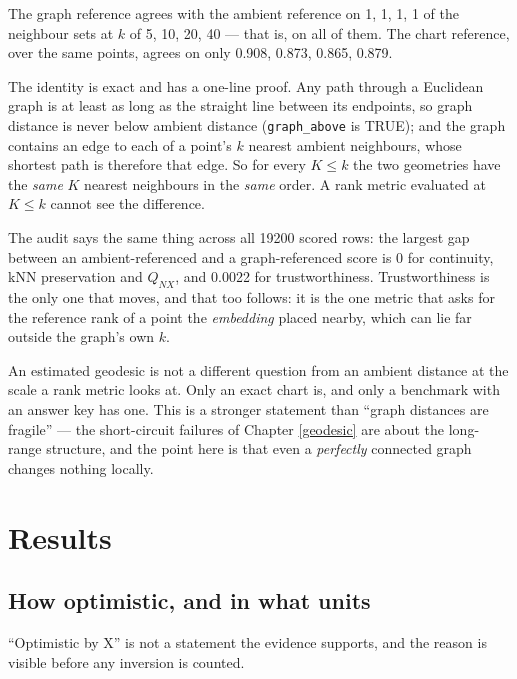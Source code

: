 \documentclass[
  british,
  a4paper,
]{book}
\begin{document}
The graph reference agrees with the ambient reference on
1, 1, 1, 1 of the neighbour sets at
\(k\) of 5, 10, 20, 40 --- that is, on all of them. The chart
reference, over the same points, agrees on only
0.908, 0.873, 0.865, 0.879.

The identity is exact and has a one-line proof. Any path through a Euclidean
graph is at least as long as the straight line between its endpoints, so graph
distance is never below ambient distance (\texttt{graph\_above} is TRUE);
and the graph contains an edge to each of a point's \(k\) nearest ambient
neighbours, whose shortest path is therefore that edge. So for every
\(K \le k\) the two geometries have the \emph{same} \(K\) nearest neighbours in the
\emph{same} order. A rank metric evaluated at \(K \le k\) cannot see the difference.

The audit says the same thing across all 19200 scored rows: the largest
gap between an ambient-referenced and a graph-referenced score is
0 for continuity, kNN
preservation and \(Q_{NX}\), and 0.0022 for
trustworthiness. Trustworthiness is the only one that moves, and that too
follows: it is the one metric that asks for the reference rank of a point the
\emph{embedding} placed nearby, which can lie far outside the graph's own \(k\).

An estimated geodesic is not a different question from an ambient distance at
the scale a rank metric looks at. Only an exact chart is, and only a benchmark
with an answer key has one. This is a stronger statement than ``graph distances
are fragile'' --- the short-circuit failures of Chapter \ref{geodesic}
\citep{balasubramanian2002isomap} are about the long-range structure, and the point
here is that even a \emph{perfectly} connected graph changes nothing locally.

\section{Results}\label{eval-results}

\subsection{How optimistic, and in what units}\label{how-optimistic-and-in-what-units}

``Optimistic by X'' is not a statement the evidence supports, and the reason is
visible before any inversion is counted.
\end{document}
